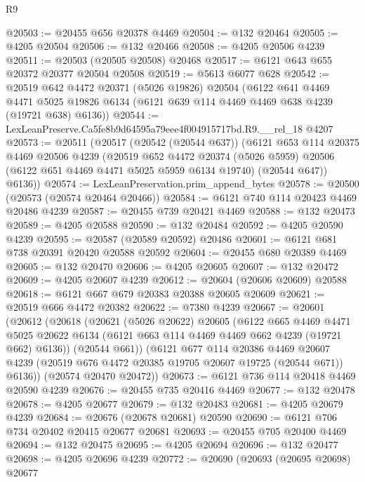 \begin{lexlean}{R9}
\begin{coremodule}
@20503 := @20455 @656 @20378 @4469
@20504 := @132 @20464
@20505 := @4205 @20504
@20506 := @132 @20466
@20508 := @4205 @20506 @4239
@20511 := @20503 (@20505 @20508) @20468
@20517 := @6121 @643 @655 @20372 @20377 @20504 @20508
@20519 := @5613 @6077 @628
@20542 := @20519
    @642
    @4472
    @20371
    (@5026 @19826)
    @20504
    (@6122
      @641
      @4469
      @4471
      @5025
      @19826
      @6134
      (@6121 @639 @114 @4469 @4469 @638 @4239 (@19721 @638) @6136))
@20544 := LexLeanPreserve.Ca5fe8b9d64595a79eee4f004915717bd.R9.__rel_18 @4207
@20573 := @20511
    (@20517
      (@20542 (@20544 @637))
      (@6121
        @653
        @114
        @20375
        @4469
        @20506
        @4239
        (@20519
          @652
          @4472
          @20374
          (@5026 @5959)
          @20506
          (@6122 @651 @4469 @4471 @5025 @5959 @6134 @19740)
          (@20544 @647))
        @6136))
@20574 := LexLeanPreservation.prim_append_bytes
@20578 := @20500 (@20573 (@20574 @20464 @20466))
@20584 := @6121 @740 @114 @20423 @4469 @20486 @4239
@20587 := @20455 @739 @20421 @4469
@20588 := @132 @20473
@20589 := @4205 @20588
@20590 := @132 @20484
@20592 := @4205 @20590 @4239
@20595 := @20587 (@20589 @20592) @20486
@20601 := @6121 @681 @738 @20391 @20420 @20588 @20592
@20604 := @20455 @680 @20389 @4469
@20605 := @132 @20470
@20606 := @4205 @20605
@20607 := @132 @20472
@20609 := @4205 @20607 @4239
@20612 := @20604 (@20606 @20609) @20588
@20618 := @6121 @667 @679 @20383 @20388 @20605 @20609
@20621 := @20519 @666 @4472 @20382
@20622 := @7380 @4239
@20667 := @20601
    (@20612
      (@20618
        (@20621
          (@5026 @20622)
          @20605
          (@6122
            @665
            @4469
            @4471
            @5025
            @20622
            @6134
            (@6121 @663 @114 @4469 @4469 @662 @4239 (@19721 @662) @6136))
          (@20544 @661))
        (@6121
          @677
          @114
          @20386
          @4469
          @20607
          @4239
          (@20519 @676 @4472 @20385 @19705 @20607 @19725 (@20544 @671))
          @6136))
      (@20574 @20470 @20472))
@20673 := @6121 @736 @114 @20418 @4469 @20590 @4239
@20676 := @20455 @735 @20416 @4469
@20677 := @132 @20478
@20678 := @4205 @20677
@20679 := @132 @20483
@20681 := @4205 @20679 @4239
@20684 := @20676 (@20678 @20681) @20590
@20690 := @6121 @706 @734 @20402 @20415 @20677 @20681
@20693 := @20455 @705 @20400 @4469
@20694 := @132 @20475
@20695 := @4205 @20694
@20696 := @132 @20477
@20698 := @4205 @20696 @4239
@20772 := @20690
    (@20693
      (@20695 @20698)
      @20677

\end{coremodule}
\end{lexlean}
